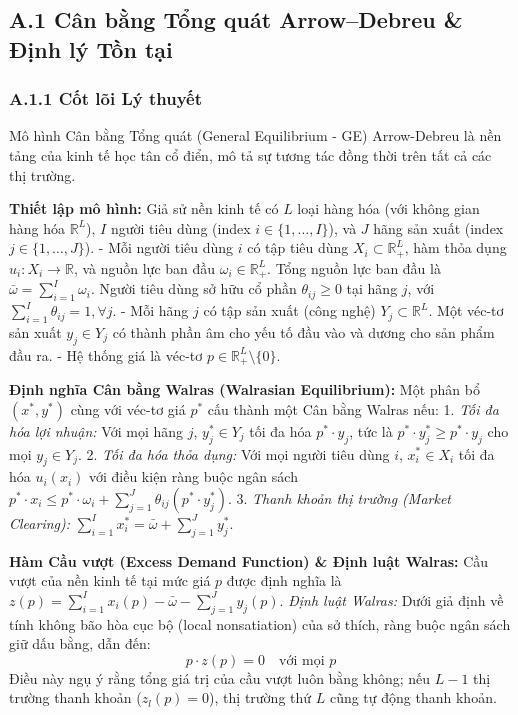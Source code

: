 \documentclass[
]{article}
\begin{document}
\subsection{A.1 Cân bằng Tổng quát Arrow--Debreu \& Định lý Tồn
tại}\label{a.1-cuxe2n-bux1eb1ng-tux1ed5ng-quuxe1t-arrowdebreu-ux111ux1ecbnh-luxfd-tux1ed3n-tux1ea1i}

\subsubsection{A.1.1 Cốt lõi Lý
thuyết}\label{a.1.1-cux1ed1t-luxf5i-luxfd-thuyux1ebft}

Mô hình Cân bằng Tổng quát (General Equilibrium - GE) Arrow-Debreu là
nền tảng của kinh tế học tân cổ điển, mô tả sự tương tác đồng thời trên
tất cả các thị trường.

\textbf{Thiết lập mô hình:} Giả sử nền kinh tế có \(L\) loại hàng hóa
(với không gian hàng hóa \(\mathbb{R}^L\)), \(I\) người tiêu dùng (index
\(i \in \{1, \dots, I\}\)), và \(J\) hãng sản xuất (index
\(j \in \{1, \dots, J\}\)). - Mỗi người tiêu dùng \(i\) có tập tiêu dùng
\(X_i \subset \mathbb{R}^L_+\), hàm thỏa dụng
\(u_i: X_i \to \mathbb{R}\), và nguồn lực ban đầu
\(\omega_i \in \mathbb{R}^L_+\). Tổng nguồn lực ban đầu là
\(\bar{\omega} = \sum_{i=1}^I \omega_i\). Người tiêu dùng sở hữu cổ phần
\(\theta_{ij} \geq 0\) tại hãng \(j\), với
\(\sum_{i=1}^I \theta_{ij} = 1, \forall j\). - Mỗi hãng \(j\) có tập sản
xuất (công nghệ) \(Y_j \subset \mathbb{R}^L\). Một véc-tơ sản xuất
\(y_j \in Y_j\) có thành phần âm cho yếu tố đầu vào và dương cho sản
phẩm đầu ra. - Hệ thống giá là véc-tơ
\(p \in \mathbb{R}^L_+ \setminus \{0\}\).

\textbf{Định nghĩa Cân bằng Walras (Walrasian Equilibrium):} Một phân bổ
\((x^*, y^*)\) cùng với véc-tơ giá \(p^*\) cấu thành một Cân bằng Walras
nếu: 1. \emph{Tối đa hóa lợi nhuận:} Với mọi hãng \(j\),
\(y_j^* \in Y_j\) tối đa hóa \(p^* \cdot y_j\), tức là
\(p^* \cdot y_j^* \geq p^* \cdot y_j\) cho mọi \(y_j \in Y_j\). 2.
\emph{Tối đa hóa thỏa dụng:} Với mọi người tiêu dùng \(i\),
\(x_i^* \in X_i\) tối đa hóa \(u_i(x_i)\) với điều kiện ràng buộc ngân
sách
\(p^* \cdot x_i \leq p^* \cdot \omega_i + \sum_{j=1}^J \theta_{ij} (p^* \cdot y_j^*)\).
3. \emph{Thanh khoản thị trường (Market Clearing):}
\(\sum_{i=1}^I x_i^* = \bar{\omega} + \sum_{j=1}^J y_j^*\).

\textbf{Hàm Cầu vượt (Excess Demand Function) \& Định luật Walras:} Cầu
vượt của nền kinh tế tại mức giá \(p\) được định nghĩa là
\(z(p) = \sum_{i=1}^I x_i(p) - \bar{\omega} - \sum_{j=1}^J y_j(p)\).
\emph{Định luật Walras:} Dưới giả định về tính không bão hòa cục bộ
(local nonsatiation) của sở thích, ràng buộc ngân sách giữ dấu bằng, dẫn
đến: \[ p \cdot z(p) = 0 \quad \text{với mọi } p \] Điều này ngụ ý rằng
tổng giá trị của cầu vượt luôn bằng không; nếu \(L-1\) thị trường thanh
khoản (\(z_l(p)=0\)), thị trường thứ \(L\) cũng tự động thanh khoản.
\end{document}
